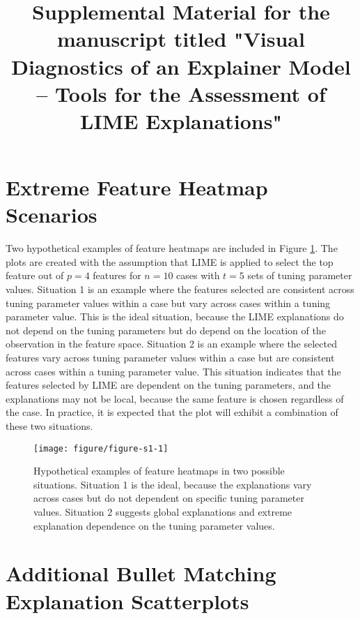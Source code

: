 \documentclass{article}\usepackage[]{graphicx}\usepackage[]{color}
\title{Supplemental Material for the manuscript titled "Visual Diagnostics of an Explainer Model -- Tools for the Assessment of LIME Explanations"}
\newenvironment{knitrout}{}{} %
\begin{document}
\maketitle



\section{Extreme Feature Heatmap Scenarios} \label{feat-heat-ex}

Two hypothetical examples of feature heatmaps are included in Figure \ref{fig:figure-s1}. The plots are created with the assumption that LIME is applied to select the top feature out of $p=4$  features for $n=10$ cases with $t=5$ sets of tuning parameter values. Situation 1 is an example where the features selected are consistent across tuning parameter values within a case but vary across cases within a tuning parameter value. This is the ideal situation, because the LIME explanations do not depend on the tuning parameters but do depend on the location of the observation in the feature space. Situation 2 is an example where the selected features vary across tuning parameter values within a case but are consistent across cases within a tuning parameter value. This situation indicates that the features selected by LIME are dependent on the tuning parameters, and the explanations may not be  local, because the same feature is chosen regardless of the case. In practice, it is expected that the plot will exhibit a combination of these two situations.

\begin{figure}
\begin{knitrout}
\color{fgcolor}

{\centering \texttt{[image: figure/figure-s1-1]} 

}



\end{knitrout}
\caption{Hypothetical examples of feature heatmaps in two possible situations.  Situation 1 is the ideal, because the explanations vary across cases but do not dependent on specific tuning parameter values. Situation 2 suggests global explanations and extreme explanation dependence on the tuning parameter values.}
\label{fig:figure-s1}
\end{figure}

\section{Additional Bullet Matching Explanation Scatterplots} \label{bullets-plus}
\end{document}
